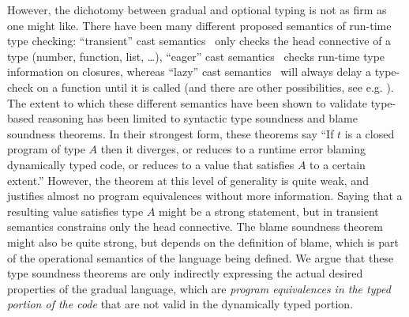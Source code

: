 \documentclass[acmsmall,nonacm]{acmart}
\begin{document}

However, the dichotomy between gradual and optional typing is not as
firm as one might like.
%
There have been many different proposed semantics of run-time type
checking: ``transient'' cast semantics~\citep{vitousekswordssiek:2017}
only checks the head connective of a type (number, function, list,
\ldots), ``eager'' cast semantics~\citep{herman2010spaceefficient} checks
run-time type information on closures, whereas ``lazy'' cast
semantics~\citep{findler-felleisen02} will always delay a type-check on
a function until it is called (and there are other possibilities, see
e.g.  \cite{siek+09designspace,greenberg15spaceefficient}).
%
The extent to which these different semantics have been shown to
validate type-based reasoning has been limited to syntactic type
soundness and blame soundness theorems.
%
In their strongest form, these theorems say ``If $t$ is a closed
program of type $A$ then it diverges, or reduces to a runtime error
blaming dynamically typed code, or reduces to a value that satisfies $A$ to a
certain extent.''
%
However, the theorem at this level of generality is quite weak, and
justifies almost no program equivalences without more information.
%
Saying that a resulting value satisfies type $A$ might be a strong
statement, but in transient semantics constrains only the head
connective.
%
The blame soundness theorem might also be quite strong, but depends on
the definition of blame, which is part of the operational semantics of
the language being defined.
%
We argue that these type soundness theorems are only indirectly
expressing the actual desired properties of the gradual language,
which are \emph{program equivalences in the typed portion of the code} that are
not valid in the dynamically typed portion. 
\end{document}
